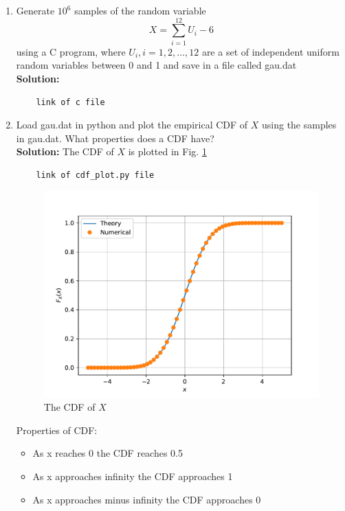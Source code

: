 \documentclass[journal,12pt,twocolumn]{IEEEtran}
\renewcommand\thesection{\arabic{section}}
\theoremstyle{remark}
\newcommand{\solution}{\noindent \textbf{Solution: }}
\numberwithin{equation}{section}
\begin{document}
\begin{enumerate}[label=\thesection.\arabic*
,ref=\thesection.\theenumi]

%
\item
Generate $10^6$ samples of the random variable
%
\begin{equation}
X = \sum_{i=1}^{12}U_i -6
\end{equation}
%
using a C program, where $U_i, i = 1,2,\dots, 12$ are  a set of independent uniform random variables between 0 and 1
and save in a file called gau.dat \\
\solution 
\begin{lstlisting}
	link of c file
\end{lstlisting}
%
\item
Load gau.dat in python and plot the empirical CDF of $X$ using the samples in gau.dat. What properties does a CDF have?
\\
\solution The CDF of $X$ is plotted in Fig. \ref{fig:gauss_cdf} \\
\begin{lstlisting}
	link of cdf_plot.py file
\end{lstlisting}
\begin{figure}[h]
\centering
\includegraphics[width=\columnwidth]{figs/2/gau_cdf.pdf}
\caption{The CDF of $X$}
\label{fig:gauss_cdf}
\end{figure}
Properties of CDF:
\begin{itemize}
	\item As x reaches 0 the CDF reaches 0.5 
	\item As x approaches infinity the CDF approaches 1
	\item As x approaches minus infinity the CDF approaches 0 

\end{itemize}
\end{enumerate}
\end{document}
